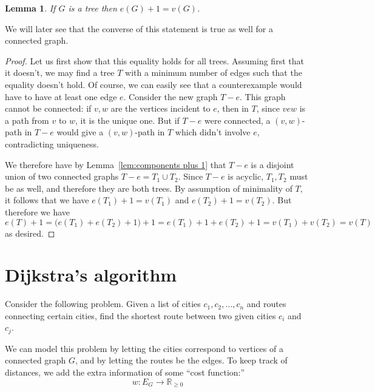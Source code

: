 \documentclass[12pt]{report}
\theoremstyle{plain}
\newtheorem{lem}[thm]{Lemma}
\begin{document}
\begin{lem} \label{tree count lem}
If $G$ is a tree then $e(G) + 1 = v(G)$.
\end{lem}
We will later see that the converse of this statement is true as well for a
connected graph.
\begin{proof}
Let us first show that this equality holds for all trees. Assuming first
that it doesn't, we may find a tree $T$ with a minimum number of edges such
that the equality doesn't hold. Of course, we can easily see that a
counterexample would have to have at least one edge $e$. Consider the new
graph $T - e$. This graph cannot be connected: if $v, w$ are the vertices
incident to $e$, then in $T$, since $v e w$ is a path from $v$ to $w$, it
is the unique one. But if $T -  e$ were connected, a $(v, w)$-path in $T -
e$ would give a $(v, w)$-path in $T$ which didn't involve $e$,
contradicting uniqueness.

We therefore have by Lemma~\ref{lem:components plus 1} that $T - e$ is a
disjoint union of two connected graphs $T - e = T_1 \cup T_2$. Since $T -
e$ is acyclic, $T_1, T_2$ must be as well, and therefore they are both
trees. By assumption of minimality of $T$, it follows that we have $e(T_1)
+ 1 = v(T_1)$ and $e(T_2) + 1 = v(T_2)$. But therefore we have
\[ e(T) + 1 = \big(e(T_1) + e(T_2) + 1\big) + 1 = e(T_1) + 1 + e(T_2) +
1 = v(T_1) + v(T_2) = v(T) \]
as desired.
\end{proof}

\section{Dijkstra's algorithm}

Consider the following problem. Given a list of cities $c_1, c_2, \ldots,
c_n$ and routes connecting certain cities, find the shortest route between
two given cities $c_i$ and $c_j$.

We can model this problem by letting the cities correspond to vertices of a
connected graph $G$, and by letting the routes be the edges. To keep track of
distances, we add the extra information of some ``cost function:''
\[ w: E_G \to \mathbb R_{\geq 0}\]
\end{document}
